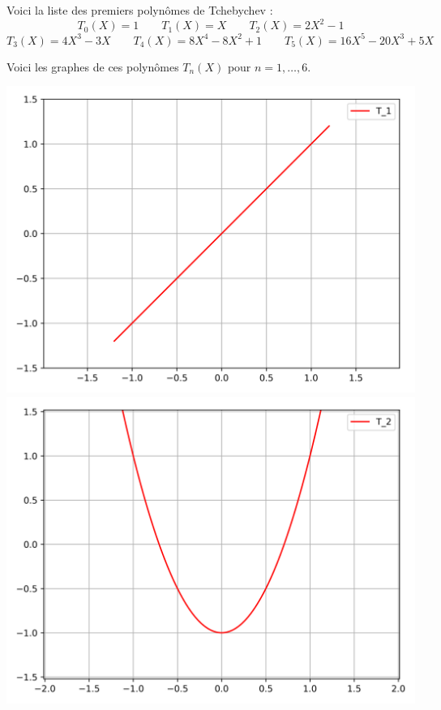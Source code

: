 \documentclass[11pt,class=report,crop=false]{standalone}
\begin{document}
Voici la liste des premiers polynômes de Tchebychev :
$$T_0(X) = 1 \qquad T_1(X) = X \qquad T_2(X) = 2X^2-1$$
$$T_3(X) = 4X^3-3X \qquad T_4(X) = 8X^4-8X^2+1 \qquad T_5(X) = 16X^5-20X^3+5X$$

Voici les graphes de ces polynômes $T_n(X)$ pour $n=1,\ldots,6$.
\begin{center}
  \includegraphics[scale=\myscale,scale=0.3]{figures/approx-tchebychev-01-1} \qquad
  \includegraphics[scale=\myscale,scale=0.3]{figures/approx-tchebychev-01-2} \qquad

\end{center}
\end{document}
